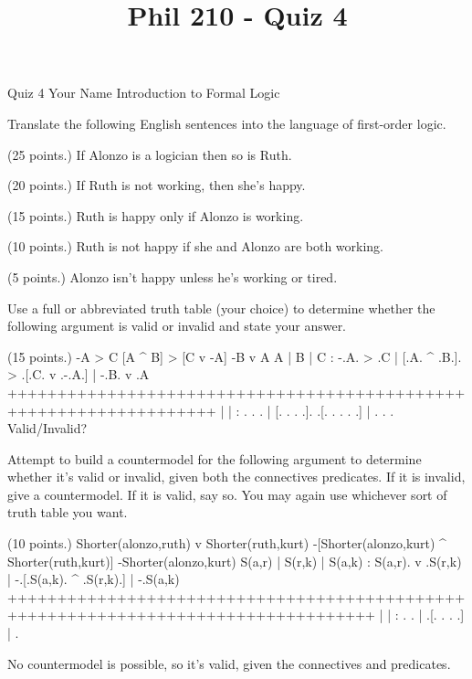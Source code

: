
\title{Phil 210 - Quiz 4}

\heading
Quiz 4
Your Name
Introduction to Formal Logic
\endheading

Translate the following English sentences into the language of first-order logic.

\problems
{} (25 points.)
If Alonzo is a logician then so is Ruth.
        \answer
        $ $
        \endanswer

 (20 points.)
If Ruth is not working, then she's happy.
        \answer
        $ $
        \endanswer

 (15 points.)
Ruth is happy only if Alonzo is working.
        \answer
        $ $
        \endanswer

 (10 points.)
Ruth is not happy if she and Alonzo are both working.
        \answer
        $ $
        \endanswer

 (5 points.)
Alonzo isn't happy unless he's working or tired.
        \answer
        $ $
        \endanswer

\endproblems

Use a full or abbreviated truth table (your choice) to determine whether the following argument is valid or invalid and state your answer.

\problems
{} (15 points.)
\argument
 -A > C
 [A ^ B] > [C v -A]
\argumentline
 -B v A
\endargument
        \answer
        \truthtable
         A | B | C : -.A. > .C | [.A. ^ .B.]. > .[.C. v .-.A.] | -.B. v .A
        +++++++++++++++++++++++++++++++++++++++++++++++++++++++++++++++++++
           |   |   :  . .   .  | [. .   . .].   .[. .   . . .] |  . .   .
        \endtruthtable
        Valid/Invalid?
        \endanswer

\endproblems

Attempt to build a countermodel for the following argument to determine whether it's valid or invalid, given both the connectives predicates. If it is invalid, give a countermodel. If it is valid, say so. You may again use whichever sort of truth table you want.

\problems
{} (10 points.)
\argument
 Shorter(alonzo,ruth) v Shorter(ruth,kurt)
 -[Shorter(alonzo,kurt) ^ Shorter(ruth,kurt)]
\argumentline
 -Shorter(alonzo,kurt)
\endargument
        \answer
        \truthtable
         S(a,r) | S(r,k) | S(a,k) : S(a,r). v .S(r,k) | -.[.S(a,k). ^ .S(r,k).] | -.S(a,k)
        +++++++++++++++++++++++++++++++++++++++++++++++++++++++++++++++++++++++++++++++++++
                |        |        :       .   .       |  .[.      .   .      .] |  .
        \endtruthtable

        \heightmodel
         
        \endheightmodel
        \OR
        No countermodel is possible, so it's valid, given the connectives and predicates.
        \endanswer

\endproblems
\bye
